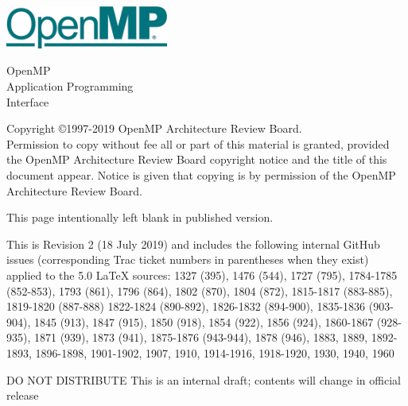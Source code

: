 
  \begin{titlepage}
    \begin{flushleft}
     \hspace{-6em} \includegraphics[width=0.4\textwidth]{openmp-logo.png}
    \end{flushleft}

    \begin{adjustwidth}{-0.75in}{0in}
    \begin{center}
      \Huge
      \textsf{OpenMP\\Application Programming\\Interface}

      \vspace{0.5in}\textsf{    }\vspace{-0.7in}
      \normalsize

      \vspace{1.0in}

      \textbf{\ompversion{}}
    \end{center}
    \end{adjustwidth}

    \vspace{3.0in}

\begin{adjustwidth}{0pt}{1em}\setlength{\parskip}{0.25\baselineskip}%
Copyright \copyright 1997-2019 OpenMP Architecture Review Board.\\
Permission to copy without fee all or part of this material is granted,
provided the OpenMP Architecture Review Board copyright notice and
the title of this document appear. Notice is given that copying is by
permission of the OpenMP Architecture Review Board.\end{adjustwidth}

  \end{titlepage}


\clearpage
\thispagestyle{empty}
\phantom{a}
This page intentionally left blank in published version.

This is Revision 2 (18 July 2019) and includes the following internal 
GitHub issues (corresponding Trac ticket numbers in parentheses when
they exist) applied to the 5.0 LaTeX sources: 1327 (395), 1476 (544), 
1727 (795), 1784-1785 (852-853), 1793 (861), 1796 (864), 1802 (870), 
1804 (872), 1815-1817 (883-885), 1819-1820 (887-888) 1822-1824 (890-892), 
1826-1832 (894-900), 1835-1836 (903-904), 1845 (913), 1847 (915), 1850 (918), 
1854 (922), 1856 (924), 1860-1867 (928-935), 1871 (939), 1873 (941), 
1875-1876 (943-944), 1878 (946), 1883, 1889, 1892-1893, 1896-1898, 
1901-1902, 1907, 1910, 1914-1916, 1918-1920, 1930, 1940, 1960

DO NOT DISTRIBUTE
This is an internal draft; contents will change in official release

\vfill

